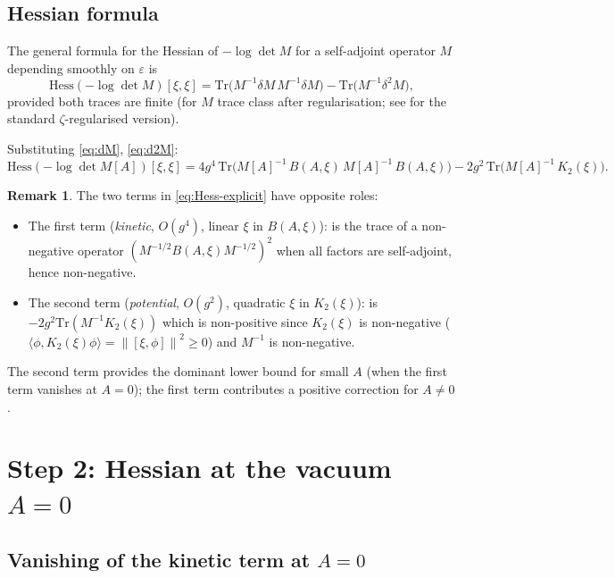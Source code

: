 \documentclass[11pt,a4paper]{amsart}
\theoremstyle{definition}
\newtheorem{remark}[theorem]{Remark}
\newcommand{\norm}[1]{\left\lVert#1\right\rVert}
\newcommand{\Tr}{\mathrm{Tr}}
\newcommand{\Hess}{\mathrm{Hess}}
\begin{document}
\subsection{Hessian formula}

The general formula for the Hessian of $-\log\det M$ for a self-adjoint
operator $M$ depending smoothly on $\varepsilon$ is
\begin{equation}\label{eq:Hess-formula}
\Hess(-\log\det M)[\xi, \xi] = \Tr\bigl(M^{-1} \delta M \, M^{-1} \delta M\bigr) - \Tr\bigl(M^{-1} \delta^2 M\bigr),
\end{equation}
provided both traces are finite (for $M$ trace class after regularisation;
see \cite[\S 2]{Vassilevich2003} for the standard $\zeta$-regularised version).

Substituting \eqref{eq:dM}, \eqref{eq:d2M}:
\begin{equation}\label{eq:Hess-explicit}
\boxed{
\Hess(-\log\det M[A])[\xi, \xi] = 4 g^4 \,\Tr\bigl(M[A]^{-1} \,B(A, \xi)\, M[A]^{-1} \,B(A, \xi)\bigr)
- 2 g^2 \,\Tr\bigl(M[A]^{-1} \,K_2(\xi)\bigr).
}
\end{equation}

\begin{remark}\label{rem:two-terms}
The two terms in \eqref{eq:Hess-explicit} have opposite roles:
\begin{itemize}
\item The first term (\emph{kinetic}, $O(g^4)$, linear $\xi$ in $B(A, \xi)$):
is the trace of a non-negative operator $(M^{-1/2} B(A,\xi) M^{-1/2})^2$ when
all factors are self-adjoint, hence non-negative.
\item The second term (\emph{potential}, $O(g^2)$, quadratic $\xi$ in $K_2(\xi)$):
is $-2g^2 \Tr(M^{-1} K_2(\xi))$ which is non-positive since $K_2(\xi)$
is non-negative ($\langle \phi, K_2(\xi)\phi\rangle = \norm{[\xi, \phi]}^2 \geq 0$)
and $M^{-1}$ is non-negative.
\end{itemize}
The second term provides the dominant lower bound for small $A$
(when the first term vanishes at $A=0$); the first term contributes
a positive correction for $A \neq 0$.
\end{remark}

\section{Step 2: Hessian at the vacuum $A = 0$}\label{sec:vacuum}

\subsection{Vanishing of the kinetic term at $A=0$}
\end{document}
